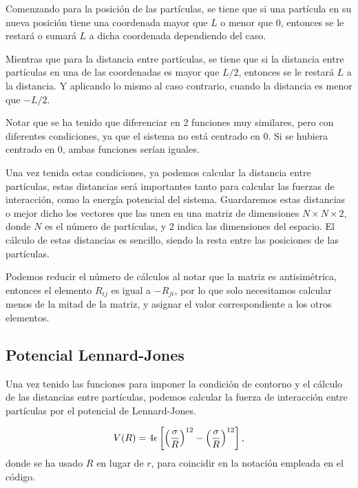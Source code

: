 \documentclass[11pt, twoside]{article} %
\begin{document}
Comenzando para la posición de las partículas, se tiene que si una partícula en su
nueva posición tiene una coordenada mayor que $L$ o menor que 0, entonces se le 
restará o sumará $L$ a dicha coordenada dependiendo del caso. 

Mientras que para la distancia entre partículas, se tiene que si la distancia entre
partículas en una de las coordenadas es mayor que $L/2$, entonces se le restará 
$L$ a la distancia. Y aplicando lo mismo al caso contrario, cuando la distancia es
menor que $-L/2$.

Notar que se ha tenido que diferenciar en 2 funciones muy similares, pero con diferentes
condiciones, ya que el sistema no está centrado en 0. Si se hubiera centrado en 0, 
ambas funciones serían iguales.

Una vez tenida estas condiciones, ya podemos calcular la distancia entre partículas,
estas distancias será importantes tanto para calcular las fuerzas de interacción, como 
la energía potencial del sistema. Guardaremos estas distancias o mejor dicho los vectores que las unen en una matriz 
de dimensiones $N\times N\times 2$, donde $N$ es el número de partículas, y 2 indica
las dimensiones del espacio. El cálculo de estas distancias es sencillo, siendo la
resta entre las posiciones de las partículas. 

Podemos reducir el número de cálculos al notar que la matriz es antisimétrica, entonces el 
elemento $R_{ij}$ es igual a $-R_{ji}$, por lo que solo necesitamos calcular menos de 
la mitad de la matriz, y asignar el valor correspondiente a los otros elementos.

\subsection{Potencial Lennard-Jones}

Una vez tenido las funciones para imponer la condición de contorno y el cálculo de 
las distancias entre partículas, podemos calcular la fuerza de interacción entre 
partículas por el potencial de Lennard-Jones.

\begin{equation}
    V(R) = 4\epsilon\left[\left(\frac{\sigma}{R}\right)^{12}-
        \left(\frac{\sigma}{R}\right)^{12}\right],
    \label{eq:Lennard_Jones_potential}
\end{equation}
donde se ha usado $R$ en lugar de $r$, para coincidir en la notación empleada en 
el código.

\vspace{3mm}
\end{document}
